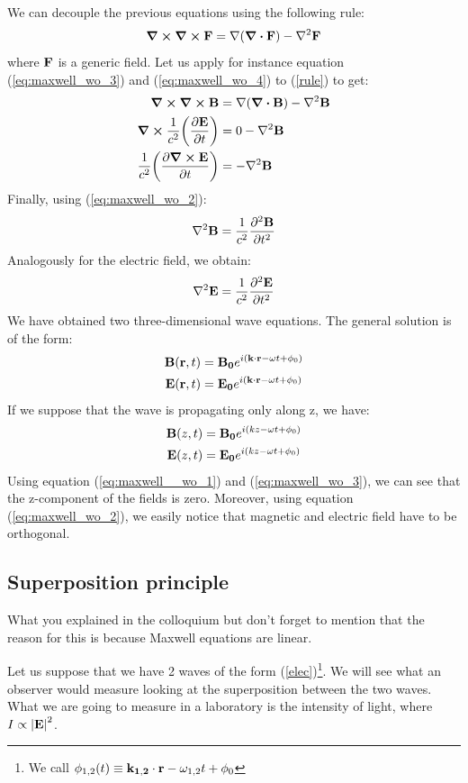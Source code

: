 \documentclass[11pt,a4paper]{article}
\begin{document}
We can decouple the previous equations using the following rule:
\begin{equation}
\curl \curl \vb{F}=\nabla (\div \vb{F})- \nabla^2\vb{F}\label{rule}
\end{equation}
where $\vb{F}$ is a generic field. Let us apply for instance equation (\ref{eq:maxwell_wo_3}) and (\ref{eq:maxwell_wo_4}) to (\ref{rule}) to get:
\begin{align*}
\curl \curl \vb{B} &=\nabla (\div \vb{B})- \nabla^2\vb{B} \\
\curl \frac{1}{c^2}\qty(\pdv{\vb{E}}{t}) &=0-\nabla^2\vb{B} \\
\frac{1}{c^2}\qty(\pdv{\curl \vb{E}}{t}) &=-\nabla^2\vb{B}
\end{align*}
Finally, using (\ref{eq:maxwell_wo_2}):
\begin{equation}
\nabla^2\vb{B}=\frac{1}{c^2}\pdv{^2 \vb{B}}{t^2}
\end{equation}
Analogously for the electric field, we obtain:
\begin{equation}
\nabla^2\vb{E}=\frac{1}{c^2}\pdv{^2 \vb{E}}{t^2}
\end{equation}
We have obtained two three-dimensional wave equations. The general solution is of the form:
\begin{align}
\vb{B}(\vb{r},t) &=\vb{B_0}e^{i(\vb{k} \cdot \vb{r}-\omega t+\phi_0)}\\
\vb{E}(\vb{r},t) &=\vb{E_0}e^{i(\vb{k} \cdot \vb{r}-\omega t+\phi_0)}\label{elec}
\end{align}
If we suppose that the wave is propagating only along z, we have:
\begin{align}
\vb{B}(z,t) &=\vb{B_0}e^{i(kz-\omega t+\phi_0)}\\
\vb{E}(z,t) &=\vb{E_0}e^{i(kz-\omega t+\phi_0)}
\end{align}
Using equation (\ref{eq:maxwell__wo_1}) and (\ref{eq:maxwell_wo_3}), we can see that the z-component of the fields is zero. Moreover, using equation (\ref{eq:maxwell_wo_2}), we easily notice that magnetic and electric field have to be orthogonal.
\subsection{Superposition principle}
What you explained in the colloquium but don't forget to mention that the reason for this is because Maxwell equations are linear.

Let us suppose that we have 2 waves of the form (\ref{elec})\footnote{We call $\phi_{1,2}(t)\equiv\vb{k_{1,2}} \cdot \vb{r}-\omega_{1,2} t+\phi_0$}. We will see what an observer would measure looking at the superposition between the two waves. What we are going to measure in a laboratory is the intensity of light, where $I\propto \abs{\vb{E}}^2$.
\end{document}
